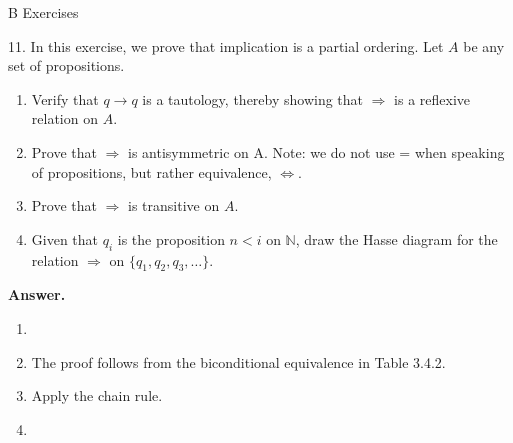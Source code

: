 \documentclass[10pt,]{book}
\theoremstyle{plain}
\theoremstyle{definition}
\theoremstyle{definition}
\theoremstyle{definition}
\theoremstyle{definition}
\begin{document}
\par\smallskip\noindent
\hypertarget{exercisegroup-6}{}\typeout{************************************************}
\typeout{************************************************}
B Exercises%
\begin{exercisegroup}
\item[11.]\hypertarget{exercise-23}{}In this exercise, we prove that implication is a partial ordering. Let \(A\) be any set of propositions.%
\par
\leavevmode%
\begin{enumerate}[label=\alph*]
\item\hypertarget{li-77}{} Verify that \(q \to  q\) is a tautology, thereby showing that \(\Rightarrow\) is a reflexive relation on \(A\).%
\item\hypertarget{li-78}{} Prove that \(\Rightarrow\) is antisymmetric on A. Note: we do not use = when speaking of propositions, but rather equivalence, \(\Leftrightarrow\).%
\item\hypertarget{li-79}{} Prove that \(\Rightarrow\) is transitive on \(A\).%
\item\hypertarget{li-80}{} Given that \(q_i\) is the proposition \(n < i\) on \(\mathbb{N}\), draw the Hasse diagram for the relation \(\Rightarrow\) on \(\{q_1, q_2, q_3,\ldots \}\).%
\end{enumerate}
%
\par\smallskip
\par\smallskip
\noindent\textbf{Answer.}\hypertarget{answer-12}{}\quad
\leavevmode%
\begin{enumerate}[label=\alph*]
\item\hypertarget{li-81}{}%
\item\hypertarget{li-82}{} The proof follows from the biconditional equivalence in Table 3.4.2.%
\item\hypertarget{li-83}{} Apply the chain rule.%
\item\hypertarget{li-84}{}\leavevmode%
\begin{figure}
\centering

\end{figure}
\end{enumerate}
\end{exercisegroup}
\end{document}
